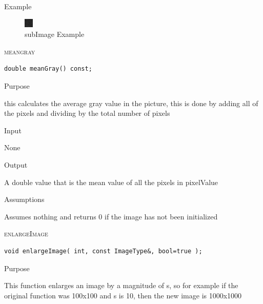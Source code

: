 \documentclass[pdftex, 11pt]{article}
\begin{document}
\begin{description}
\begin{description}
			\item{Example}

				\begin{figure}[ht!]
					\centering
					\caption{subImage Example}
					\includegraphics{images/outsubimg.png}
				\end{figure}

		\end{description}


	\item{\textsc{meangray}}
		\begin{description}

\begin{lstlisting}
double meanGray() const;
\end{lstlisting}

			\item{Purpose}

				
				this calculates the average gray value in the
				picture, this is done by adding
				all of the pixels and dividing by the total
				number of pixels

			\item{Input}

				None

			\item{Output}

				A double value that is the mean value of all
				the pixels in pixelValue


			\item{Assumptions}

				Assumes nothing and returns 0 if the image 
				has not been initialized

		\end{description}


	\item{\textsc{enlargeImage}}
		\begin{description}

\begin{lstlisting}
void enlargeImage( int, const ImageType&, bool=true );
\end{lstlisting}

			\item{Purpose}
				
				This function enlarges an image by a 
				magnitude of s, so for example if the
				original function was 100x100 and s is 
				10, then the new image is 1000x1000


\end{description}
\end{description}
\end{document}
